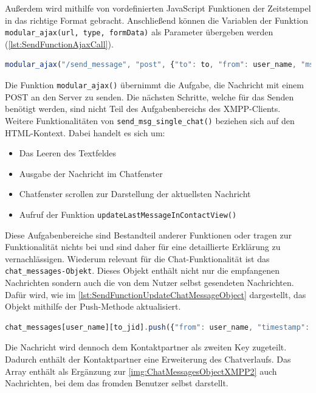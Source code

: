 \documentclass[a4paper,titlepage,halfparskip,12pt]{scrreprt}
\begin{document}
\begin{onehalfspacing}
Außerdem wird mithilfe von vordefinierten JavaScript Funktionen der Zeitstempel in das richtige Format gebracht. Anschließend können die Variablen der Funktion \texttt{modular\_ajax(url, type, formData)} als Parameter übergeben werden (\autoref{lst:SendFunctionAjaxCall}).
\begin{lstlisting}[language=Javascript,caption=Aufruf der Funktion \texttt{modular\_ajax(url, type, formData)} mit allen Parametern  ,label={lst:SendFunctionAjaxCall}]
modular_ajax("/send_message", "post", {"to": to, "from": user_name, "msg_subject": "", "msg_body": msg, "msg_type": "chat"});
\end{lstlisting}
Die Funktion \texttt{modular\_ajax()} übernimmt die Aufgabe, die Nachricht mit einem POST an den Server zu senden. Die nächsten Schritte, welche für das Senden benötigt werden, sind nicht Teil des Aufgabenbereichs des XMPP-Clients.
Weitere Funktionalitäten von \texttt{send\_msg\_single\_chat()} beziehen sich auf den \ac{HTML}-Kontext. Dabei handelt es sich um:
\begin{itemize}
	\item Das Leeren des Textfeldes
	\item Ausgabe der Nachricht im Chatfenster
	\item Chatfenster scrollen zur Darstellung der aktuellsten Nachricht
	\item Aufruf der Funktion \texttt{updateLastMessageInContactView()} 
\end{itemize}
Diese Aufgabenbereiche sind Bestandteil anderer Funktionen oder tragen zur Funktionalität nichts bei und sind daher für eine detaillierte Erklärung zu vernachlässigen. Wiederum relevant für die Chat-Funktionalität ist das \texttt{chat\_messages-Objekt}. Dieses Objekt enthält nicht nur die empfangenen Nachrichten sondern auch die von dem Nutzer selbst gesendeten Nachrichten. Dafür wird, wie im \autoref{lst:SendFunctionUpdateChatMessageObject} dargestellt, das Objekt mithilfe der Push-Methode aktualisiert.
\begin{lstlisting}[language=Javascript,caption=Nachricht in Dictionary einfügen  ,label={lst:SendFunctionUpdateChatMessageObject}]
chat_messages[user_name][to_jid].push({"from": user_name, "timestamp": msg_timestamp, "txt": msg, "type": "chat"});
\end{lstlisting}
Die Nachricht wird dennoch dem Kontaktpartner als zweiten Key zugeteilt. Dadurch enthält der Kontaktpartner eine Erweiterung des Chatverlaufs. Das Array enthält als Ergänzung zur \autoref{img:ChatMessagesObjectXMPP2} auch Nachrichten, bei dem das \glqq from\grqq den Benutzer selbst darstellt.

\end{onehalfspacing}
\end{document}
